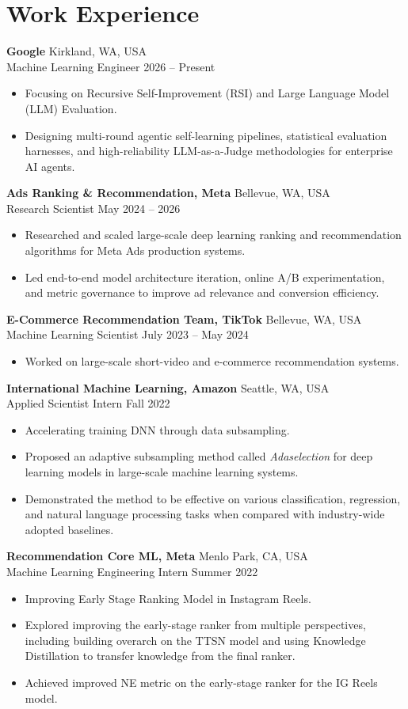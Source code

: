 \documentclass[10pt,letterpaper]{article}
\newcommand{\entry}[4]{%
  \noindent\hspace{1.2em}\begin{minipage}[t]{\dimexpr\textwidth-1.2em\relax}
    \textbf{#1} \hfill #2 \\
    #3 \hfill #4
  \end{minipage}\par\vspace{0.1em}
}
\newenvironment{cvitems}{%
  \begin{itemize}[leftmargin=2.8em,label=--,topsep=1pt,itemsep=1pt,parsep=0pt]
}{%
  \end{itemize}\vspace{0.2em}
}
\begin{document}
\section{Work Experience}

\entry{Google}{Kirkland, WA, USA}{Machine Learning Engineer}{2026 -- Present}
\begin{cvitems}
  \item Focusing on Recursive Self-Improvement (RSI) and Large Language Model (LLM) Evaluation.
  \item Designing multi-round agentic self-learning pipelines, statistical evaluation harnesses, and high-reliability LLM-as-a-Judge methodologies for enterprise AI agents.
\end{cvitems}

\entry{Ads Ranking \& Recommendation, Meta}{Bellevue, WA, USA}{Research Scientist}{May 2024 -- 2026}
\begin{cvitems}
  \item Researched and scaled large-scale deep learning ranking and recommendation algorithms for Meta Ads production systems.
  \item Led end-to-end model architecture iteration, online A/B experimentation, and metric governance to improve ad relevance and conversion efficiency.
\end{cvitems}

\entry{E-Commerce Recommendation Team, TikTok}{Bellevue, WA, USA}{Machine Learning Scientist}{July 2023 -- May 2024}
\begin{cvitems}
  \item Worked on large-scale short-video and e-commerce recommendation systems.
\end{cvitems}

\entry{International Machine Learning, Amazon}{Seattle, WA, USA}{Applied Scientist Intern}{Fall 2022}
\begin{cvitems}
  \item Accelerating training DNN through data subsampling.
  \item Proposed an adaptive subsampling method called \textit{Adaselection} for deep learning models in large-scale machine learning systems.
  \item Demonstrated the method to be effective on various classification, regression, and natural language processing tasks when compared with industry-wide adopted baselines.
\end{cvitems}

\newpage
\entry{Recommendation Core ML, Meta}{Menlo Park, CA, USA}{Machine Learning Engineering Intern}{Summer 2022}
\begin{cvitems}
  \item Improving Early Stage Ranking Model in Instagram Reels.
  \item Explored improving the early-stage ranker from multiple perspectives, including building overarch on the TTSN model and using Knowledge Distillation to transfer knowledge from the final ranker.
  \item Achieved improved NE metric on the early-stage ranker for the IG Reels model.
\end{cvitems}
\end{document}
